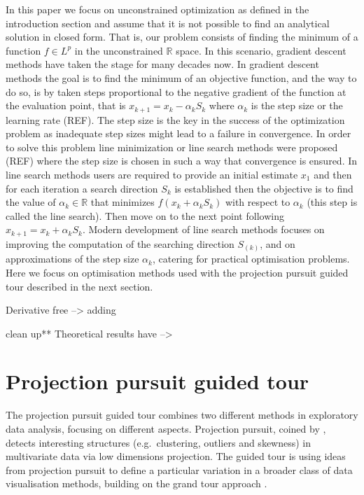 \documentclass[12pt]{article}
\begin{document}
In this paper we focus on unconstrained optimization as defined in the introduction section and assume that it is not possible to find an analytical solution in closed form. That is, our problem consists of finding the minimum of a function \(f \in L^p\) in the unconstrained \(\mathbb{R}\) space. In this scenario, gradient descent methods have taken the stage for many decades now. In gradient descent methods the goal is to find the minimum of an objective function, and the way to do so, is by taken steps proportional to the negative gradient of the function at the evaluation point, that is \(x_{k+1} = x_k -\alpha_kS_k\) where \(\alpha_k\) is the step size or the learning rate (REF). The step size is the key in the success of the optimization problem as inadequate step sizes might lead to a failure in convergence. In order to solve this problem line minimization or line search methods were proposed (REF) where the step size is chosen in such a way that convergence is ensured. In line search methods users are required to provide an initial estimate \(x_{1}\) and then for each iteration a search direction \(S_k\) is established then the objective is to find the value of \(\alpha_k \in \mathbb{R}\) that minimizes \(f(x_k + \alpha_kS_k)\) with respect to \(\alpha_k\) (this step is called the line search). Then move on to the next point following \(x_{k+1} = x_k + \alpha_kS_k\).
Modern development of line search methods focuses on improving the computation of the searching direction \(S_{(k)}\), and on approximations of the step size \(\alpha_k\), catering for practical optimisation problems. Here we focus on optimisation methods used with the projection pursuit guided tour described in the next section.

Derivative free --\textgreater{} adding

clean up** Theoretical results have --\textgreater{}

\hypertarget{tour}{%
\section{Projection pursuit guided tour}\label{tour}}

The projection pursuit guided tour combines two different methods in exploratory data analysis, focusing on different aspects. Projection pursuit, coined by \citet{friedman1974projection}, detects interesting structures (e.g.~clustering, outliers and skewness) in multivariate data via low dimensions projection. The guided tour is using ideas from projection pursuit to define a particular variation in a broader class of data visualisation methods, building on the grand tour approach \citep{As85}.
\end{document}
